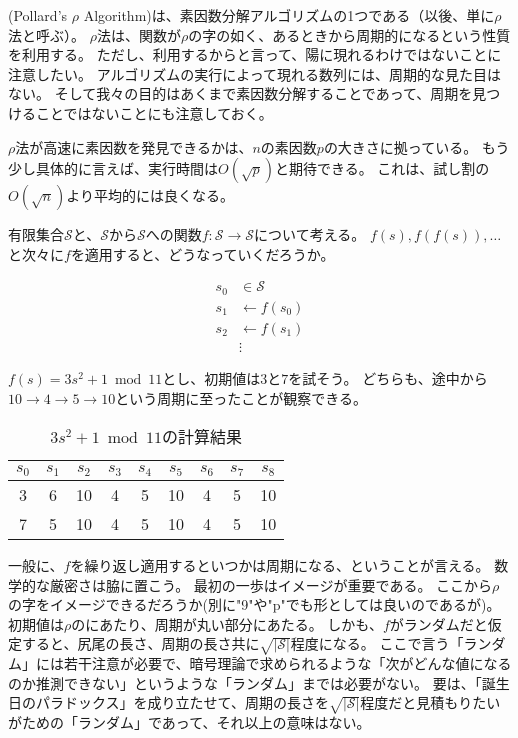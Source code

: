 (Pollard's $\rho$ Algorithm)は、素因数分解アルゴリズムの1つである（以後、単に$\rho$法と呼ぶ）\cite{pollard:1978}。
$\rho$法は、関数が$\rho$の字の如く、あるときから周期的になるという性質を利用する。
ただし、利用するからと言って、陽に現れるわけではないことに注意したい。
アルゴリズムの実行によって現れる数列には、周期的な見た目はない。
そして我々の目的はあくまで素因数分解することであって、周期を見つけることではないことにも注意しておく。

$\rho$法が高速に素因数を発見できるかは、$n$の素因数$p$の大きさに拠っている。
もう少し具体的に言えば、実行時間は$O(\sqrt{p})$と期待できる。
これは、試し割の$O(\sqrt{n})$より平均的には良くなる。

有限集合$\mathcal{S}$と、$\mathcal{S}$から$\mathcal{S}$への関数$f:\mathcal{S}\to\mathcal{S}$について考える。
$f(s), f(f(s)),\ldots$と次々に$f$を適用すると、どうなっていくだろうか。

\begin{align*}
s_0 &\in \mathcal{S}\\
s_1 &\gets f(s_0)\\
s_2 &\gets f(s_1)\\
&\vdots
\end{align*}

$f(s)=3s^2+1\bmod{11}$とし、初期値は$3$と$7$を試そう。
どちらも、途中から$10\to4\to5\to10$という周期に至ったことが観察できる。
\begin{table}[htbp] \caption{$3s^2+1\bmod{11}$の計算結果}
    \begin{center}
     \begin{tabular}{|c|c|c|c|c|c|c|c|c|} \hline
      $s_0$ & $s_1$ & $s_2$ & $s_3$ & $s_4$ & $s_5$ & $s_6$ & $s_7$ & $s_8$ \\ \hline
      3     & 6     & 10    & 4     & 5     & 10    & 4     & 5     & 10    \\ \hline
      7     & 5     & 10    & 4     & 5     & 10    & 4     & 5     & 10    \\ \hline
     \end{tabular}
    \end{center}
\end{table}

一般に、$f$を繰り返し適用するといつかは周期になる、ということが言える。
数学的な厳密さは脇に置こう。
最初の一歩はイメージが重要である。
ここから$\rho$の字をイメージできるだろうか(別に"9"や"p"でも形としては良いのであるが)。
初期値は$\rho$のにあたり、周期が丸い部分にあたる。
しかも、$f$がランダムだと仮定すると、尻尾の長さ、周期の長さ共に$\sqrt{|\mathcal{S}|}$程度になる。
ここで言う「ランダム」には若干注意が必要で、暗号理論で求められるような「次がどんな値になるのか推測できない」というような「ランダム」までは必要がない。
要は、「誕生日のパラドックス」を成り立たせて、周期の長さを$\sqrt{|\mathcal{S}|}$程度だと見積もりたいがための「ランダム」であって、それ以上の意味はない。

